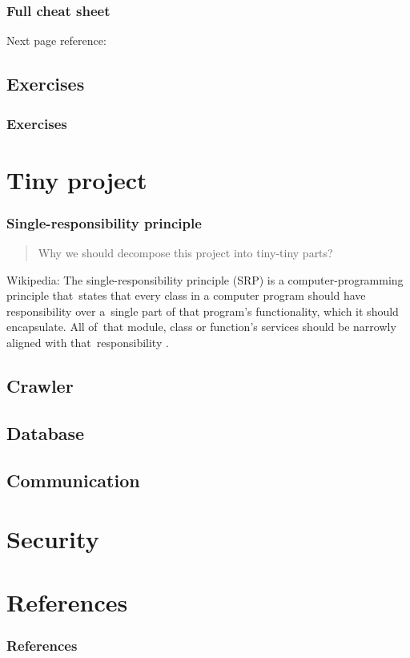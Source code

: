 \documentclass{beamer}
\begin{document}
\begin{frame}
    \frametitle{Full cheat sheet}
    Next page reference: \cite{cheat_sheet_full}
\end{frame}
{

}

\subsection{Exercises}
\begin{frame}
    \frametitle{Exercises}
\end{frame}

\section{Tiny project}
\begin{frame}
    \frametitle{Single-responsibility principle}
    \begin{quote}
        Why we should decompose this project into tiny-tiny parts?
    \end{quote}

    \begin{block}{Wikipedia:}
        The single-responsibility principle (SRP) is a computer-programming principle that\
        states that every class in a computer program should have responsibility over a\
        single part of that program's functionality, which it should encapsulate. All of\
        that module, class or function's services should be narrowly aligned with that\
        responsibility \cite{SRP_wiki}.
    \end{block}
\end{frame}
\subsection{Crawler}
\subsection{Database}
\subsection{Communication}

\section{Security}

\section{References}
\begin{frame}[t, allowframebreaks]
    \frametitle{References}
    \printbibliography
\end{frame}
\end{document}
